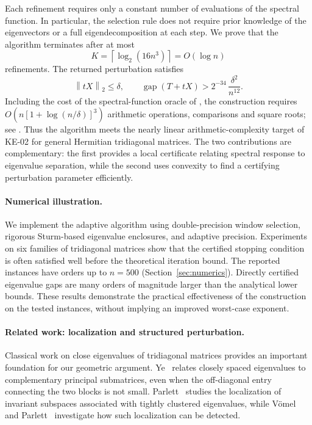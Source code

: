 \documentclass[10pt,a4paper]{article}
\newcommand{\norm}[1]{\left\lVert #1\right\rVert}
\DeclareMathOperator{\gap}{gap}
\begin{document}
Each refinement requires only a constant number
of evaluations of the spectral function. In
particular, the selection rule does not require
prior knowledge of the eigenvectors or a full
eigendecomposition at each step. We prove that
the algorithm terminates after at most
\[
K=\left\lceil\log_2(16n^3)\right\rceil
=O(\log n)
\]
refinements. The returned perturbation satisfies
\begin{equation}\label{eq:intro-main-result}
\boxed{
\norm{tX}_2\leq\delta,\qquad
\gap(T+tX)>2^{-34}\,\frac{\delta^2}{n^{12}}.
}
\end{equation}
Including the cost of the spectral-function oracle of
, the construction requires
$O(n[1+\log(n/\delta)]^3)$ arithmetic operations,
comparisons and square roots; see .
Thus the algorithm meets the nearly linear
arithmetic-complexity target of KE-02 for
general Hermitian tridiagonal matrices. 
The two contributions are complementary:
the first provides a local certificate relating
spectral response to eigenvalue separation, while
the second uses convexity to find a certifying
perturbation parameter efficiently.

\paragraph{Numerical illustration.}
We implement the adaptive algorithm using
double-precision window selection, rigorous
Sturm-based eigenvalue enclosures, and adaptive
precision. Experiments on six families of
tridiagonal matrices show that the certified
stopping condition is often satisfied well
before the theoretical iteration bound.
The reported instances have orders up to $n=500$
(Section~\ref{sec:numerics}). Directly certified
eigenvalue gaps are many orders of magnitude
larger than the analytical lower bounds. These
results demonstrate the practical effectiveness
of the construction on the tested instances,
without implying an improved worst-case exponent.

\paragraph{Related work: localization and structured perturbation.}
Classical work on close eigenvalues of tridiagonal
matrices provides an important foundation for our
geometric argument. Ye~\cite{Ye1995} relates
closely spaced eigenvalues to complementary
principal submatrices, even when the off-diagonal
entry connecting the two blocks is not small.
Parlett~\cite{Parlett1996} studies the localization
of invariant subspaces associated with tightly
clustered eigenvalues, while V{\"o}mel and
Parlett~\cite{VoemelParlett2011} investigate
how such localization can be detected.
\end{document}
